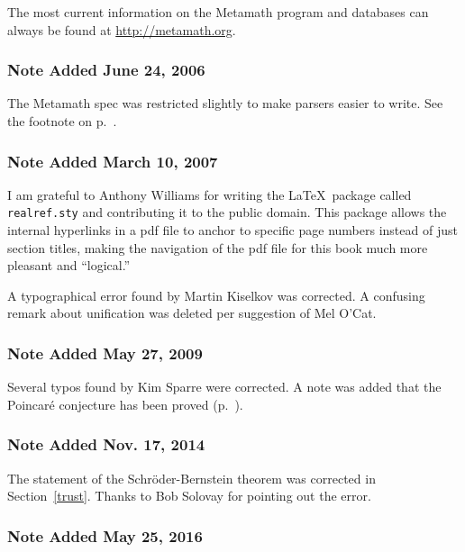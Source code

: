 The most current information on the Metamath program and databases can
always be found at \url{http://metamath.org}.


\subsubsection{Note Added June 24, 2006}\label{note2006}

The Metamath spec was restricted slightly to make parsers easier to
write.  See the footnote on p.~\pageref{namespace}.

\subsubsection{Note Added March 10, 2007}\label{note2006b}

I am grateful to Anthony Williams for writing
the \LaTeX\ package called {\tt realref.sty} and contributing it to the
public domain.  This package allows the internal hyperlinks in a {\sc
pdf} file to anchor to specific page numbers instead of just section
titles, making the navigation of the {\sc pdf} file for this book much
more pleasant and ``logical.''

A typographical error found by Martin Kiselkov was corrected.
A confusing remark about unification was deleted per suggestion of
Mel O'Cat.

\subsubsection{Note Added May 27, 2009}\label{note2009}

Several typos found by Kim Sparre were corrected.  A note was added that
the Poincar\'{e} conjecture has been proved (p.~\pageref{poincare}).

\subsubsection{Note Added Nov. 17, 2014}\label{note2014}

The statement of the Schr\"{o}der-Bernstein theorem was corrected in
Section~\ref{trust}.  Thanks to Bob Solovay for pointing out the error.

\subsubsection{Note Added May 25, 2016}\label{note2016}

